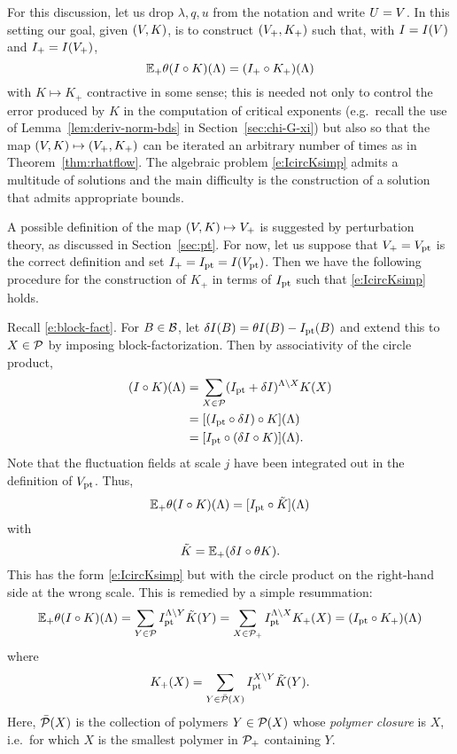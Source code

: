 For this discussion, let us drop $\lambda, q, u$ from the notation and write
$U = V$. In this setting our goal, given $(V, K)$, is to construct
$(V_+, K_+)$ such that, with $I = I(V)$ and $I_+ = I(V_+)$,
\begin{equation}
\label{e:IcircKsimp}
\mathbb{E}_+ \theta (I \circ K)(\Lambda) = (I_+ \circ K_+)(\Lambda)
\end{equation}
with $K \mapsto K_+$ contractive in some sense; this is needed not only to
control the error produced by $K$ in the computation of critical exponents
(e.g.\ recall the use of Lemma~\ref{lem:deriv-norm-bds} in Section~\ref{sec:chi-G-xi})
but also so that the map
$(V, K) \mapsto (V_+, K_+)$ can be iterated an arbitrary number of times as in
Theorem~\ref{thm:rhatflow}. The algebraic problem \eqref{e:IcircKsimp} admits
a multitude of solutions and the main difficulty is the construction of a
solution that admits appropriate bounds.

A possible definition of the map $(V, K) \mapsto V_+$ is suggested by perturbation
theory, as discussed in Section~\ref{sec:pt}. For now, let us suppose that $V_+ = V_{\rm pt}$
is the correct definition and set $I_+ = I_{\rm pt} = I(V_{\rm pt})$. Then we have the following procedure
for the construction of $K_+$ in terms of $I_{\rm pt}$ such that \eqref{e:IcircKsimp} holds.

Recall \eqref{e:block-fact}.
For $B\in\mathcal{B}$, let $\delta I(B) = \theta I(B) - I_{\rm pt}(B)$ and extend this to $X\in\mathcal{P}$
by imposing block-factorization. Then by associativity of the circle product,
\begin{align}
(I \circ K)(\Lambda)
	&= \sum_{X\in\mathcal{P}} (I_{\rm pt} + \delta I)^{\Lambda \setminus X} K(X) \nonumber \\
	&= [(I_{\rm pt} \circ \delta I) \circ K](\Lambda) \nonumber \\
	&= [I_{\rm pt} \circ (\delta I \circ K)](\Lambda).
\end{align}
Note that the fluctuation fields at scale $j$ have been integrated out in the
definition of $V_{\rm pt}$. Thus,
\begin{equation}
\mathbb{E}_+ \theta(I \circ K)(\Lambda) = [I_{\rm pt} \circ \tilde K](\Lambda)
\end{equation}
with
\begin{equation}
\tilde K = \mathbb{E}_+ (\delta I \circ \theta K).
\end{equation}
This has the form \eqref{e:IcircKsimp} but with the circle product on the right-hand
side at the wrong scale. This is remedied by a simple resummation:
\begin{equation}
\mathbb{E}_+ \theta (I \circ K)(\Lambda)
	= \sum_{Y\in\mathcal{P}} I_{\rm pt}^{\Lambda \setminus Y} \tilde K(Y)
	= \sum_{X\in\mathcal{P}_+} I_{\rm pt}^{\Lambda \setminus X} K_+(X)
	= (I_{\rm pt} \circ K_+)(\Lambda)
\end{equation}
where
\begin{equation}
\label{e:Kplus3}
K_+(X) = \sum_{Y \in \bar{\mathcal{P}}(X)} I_{\rm pt}^{X \setminus Y} \tilde K(Y).
\end{equation}
Here, $\bar{\mathcal{P}}(X)$ is the collection of polymers $Y\in\mathcal{P}(X)$ whose
\emph{polymer closure} is $X$, i.e.\ for which
$X$ is the smallest polymer in $\mathcal{P}_+$ containing $Y$.

